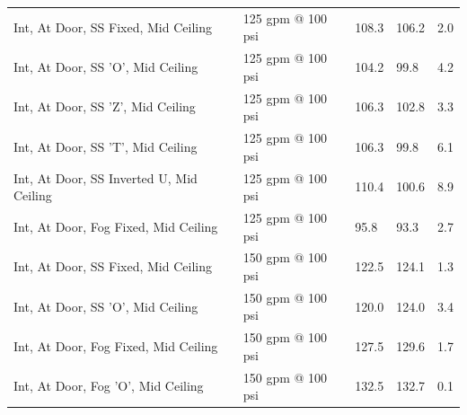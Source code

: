 \documentclass{article}
\begin{document}
\begin{table}[]
\begin{tabular}{lllll}
Int, At Door, SS Fixed, Mid Ceiling                   & 125 gpm @ 100 psi                   & 108.3                                  & 106.2                                   & 2.0                                     \\
Int, At Door, SS 'O', Mid Ceiling                     & 125 gpm @ 100 psi                   & 104.2                                  & 99.8                                    & 4.2                                     \\
Int, At Door, SS 'Z', Mid Ceiling                     & 125 gpm @ 100 psi                   & 106.3                                  & 102.8                                   & 3.3                                     \\
Int, At Door, SS 'T', Mid Ceiling                     & 125 gpm @ 100 psi                   & 106.3                                  & 99.8                                    & 6.1                                     \\
Int, At Door, SS Inverted U, Mid Ceiling              & 125 gpm @ 100 psi                   & 110.4                                  & 100.6                                   & 8.9                                     \\
Int, At Door, Fog Fixed, Mid Ceiling                  & 125 gpm @ 100 psi                   & 95.8                                   & 93.3                                    & 2.7                                     \\
Int, At Door, SS Fixed, Mid Ceiling                   & 150 gpm @ 100 psi                   & 122.5                                  & 124.1                                   & 1.3                                     \\
Int, At Door, SS 'O', Mid Ceiling                     & 150 gpm @ 100 psi                   & 120.0                                  & 124.0                                   & 3.4                                     \\
Int, At Door, Fog Fixed, Mid Ceiling                  & 150 gpm @ 100 psi                   & 127.5                                  & 129.6                                   & 1.7                                     \\
Int, At Door, Fog 'O', Mid Ceiling                    & 150 gpm @ 100 psi                   & 132.5                                  & 132.7                                   & 0.1                                     \\

\end{tabular}
\end{table}
\end{document}
